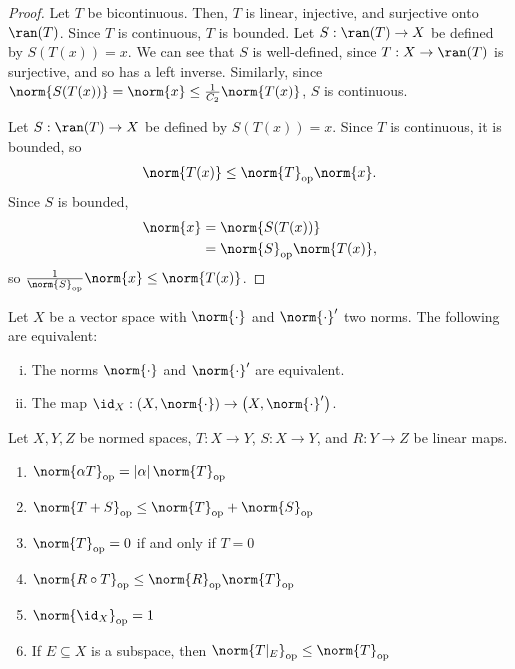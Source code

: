 \documentclass[10pt]{mypackage}
\begin{document}
\begin{proof}
  Let $T$ be bicontinuous. Then, $T$ is linear, injective, and surjective onto $\ran(T)$. Since $T$ is continuous, $T$ is bounded. Let $S: \ran(T) \rightarrow X$ be defined by $S\left(T(x)\right) = x$. We can see that $S$ is well-defined, since $T: X\rightarrow \ran(T)$ is surjective, and so has a left inverse. Similarly, since $\norm{S(T(x))} = \norm{x} \leq \frac{1}{C_2}\norm{T(x)}$, $S$ is continuous.\newline

  Let $S: \ran(T) \rightarrow X$ be defined by $S(T(x)) = x$. Since $T$ is continuous, it is bounded, so
  \begin{align*}
    \norm{T(x)}\leq \norm{T}_{\text{op}}\norm{x}.
  \end{align*}
  Since $S$ is bounded,
  \begin{align*}
    \norm{x} &= \norm{S(T(x))}\\
             &= \norm{S}_{\text{op}}\norm{T(x)},
  \end{align*}
  so $\frac{1}{\norm{S}_{\text{op}}}\norm{x} \leq \norm{T(x)}$.
\end{proof}
\begin{corollary}
  Let $X$ be a vector space with $\norm{\cdot}$ and $\norm{\cdot}'$ two norms. The following are equivalent:
  \begin{enumerate}[(i)]
    \item The norms $\norm{\cdot}$ and $\norm{\cdot}'$ are equivalent.
    \item The map $\id_{X}:\left(X,\norm{\cdot}\right)\rightarrow \left(X,\norm{\cdot}'\right)$.
  \end{enumerate}
\end{corollary}
\begin{proposition}
  Let $X,Y,Z$ be normed spaces, $T: X\rightarrow Y$, $S: X\rightarrow Y$, and $R:Y\rightarrow Z$ be linear maps.
  \begin{enumerate}[(1)]
    \item $\norm{\alpha T}_{\text{op}}= \left\vert \alpha \right\vert\norm{T}_{\text{op}}$
    \item $\norm{T + S}_{\text{op}}\leq \norm{T}_{\text{op}} + \norm{S}_{\text{op}}$
    \item $\norm{T}_{\text{op}}  = 0$ if and only if $T = 0$
    \item $\norm{R\circ T}_{\text{op}}\leq \norm{R}_{\text{op}}\norm{T}_{\text{op}}$
    \item $\norm{\id_{X}}_{\text{op}} = 1$
    \item If $E\subseteq X$ is a subspace, then $\norm{T|_{E}}_{\text{op}}\leq \norm{T}_{\text{op}}$
  \end{enumerate}
\end{proposition}
\end{document}
